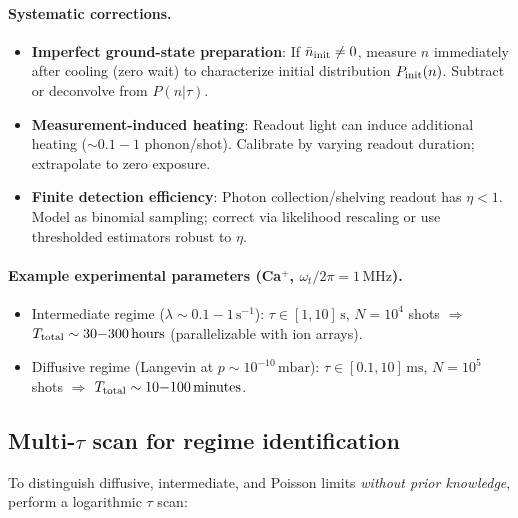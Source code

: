 \paragraph{Systematic corrections.}
\begin{itemize}
\item \textbf{Imperfect ground-state preparation}: 
  If $\bar{n}_{\rm init} \neq 0$, measure $n$ immediately after cooling (zero wait) 
  to characterize initial distribution $P_{\rm init}(n)$. 
  Subtract or deconvolve from $P(n|\tau)$.

\item \textbf{Measurement-induced heating}: 
  Readout light can induce additional heating ($\sim 0.1{-}1$ phonon/shot). 
  Calibrate by varying readout duration; extrapolate to zero exposure.

\item \textbf{Finite detection efficiency}: 
  Photon collection/shelving readout has $\eta < 1$. 
  Model as binomial sampling; correct via likelihood rescaling 
  or use thresholded estimators robust to $\eta$.
\end{itemize}

\paragraph{Example experimental parameters (Ca$^+$, $\omega_t/2\pi = 1\,\text{MHz}$).}
\begin{itemize}
\item Intermediate regime ($\lambda \sim 0.1{-}1\,\text{s}^{-1}$): 
  $\tau \in [1, 10]\,\text{s}$, $N = 10^4$ shots $\Rightarrow$ 
  $T_{\rm total} \sim 30{-}300\,\text{hours}$ (parallelizable with ion arrays).
\item Diffusive regime (Langevin at $p \sim 10^{-10}\,\text{mbar}$): 
  $\tau \in [0.1, 10]\,\text{ms}$, $N = 10^5$ shots $\Rightarrow$ 
  $T_{\rm total} \sim 10{-}100\,\text{minutes}$.
\end{itemize}

\subsection{Multi-$\tau$ scan for regime identification}

To distinguish diffusive, intermediate, and Poisson limits \emph{without prior knowledge}, 
perform a logarithmic $\tau$ scan:

